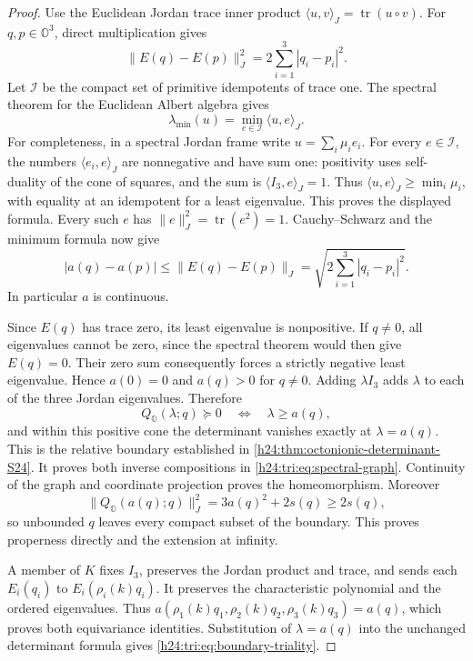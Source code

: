 \begin{proof}
Use the Euclidean Jordan trace inner product
\(\langle u,v\rangle_J=\operatorname{tr}(u\circ v)\).
For \(q,p\in\mathbb O^3\), direct multiplication gives
\[
 \|E(q)-E(p)\|_J^2=2\sum_{i=1}^3|q_i-p_i|^2.
\]
Let \(\mathcal I\) be the compact set of primitive idempotents of
trace one. The spectral theorem for the Euclidean Albert algebra gives
\[
 \lambda_{\min}(u)=\min_{e\in\mathcal I}\langle u,e\rangle_J.
\]
For completeness, in a spectral Jordan frame write
\(u=\sum_i\mu_i e_i\). For every \(e\in\mathcal I\), the numbers
\(\langle e_i,e\rangle_J\) are nonnegative and have sum one: positivity
uses self-duality of the cone of squares, and the sum is
\(\langle I_3,e\rangle_J=1\). Thus
\(\langle u,e\rangle_J\geq\min_i\mu_i\), with equality at an
idempotent for a least eigenvalue. This proves the displayed formula.
Every such \(e\) has \(\|e\|_J^2=\operatorname{tr}(e^2)=1\).
Cauchy--Schwarz and the minimum formula now give
\begin{equation}
 |a(q)-a(p)|\leq\|E(q)-E(p)\|_J
       =\sqrt{2\sum_{i=1}^3|q_i-p_i|^2}.
 \label{h24:tri:eq:spectral-Lipschitz}
\end{equation}
In particular \(a\) is continuous.

Since \(E(q)\) has trace zero, its least eigenvalue is nonpositive.
If \(q\ne0\), all eigenvalues cannot be zero, since the spectral theorem
would then give \(E(q)=0\). Their zero sum consequently forces a
strictly negative least eigenvalue. Hence \(a(0)=0\) and
\(a(q)>0\) for \(q\ne0\).
Adding \(\lambda I_3\) adds \(\lambda\) to each of the three Jordan
eigenvalues. Therefore
\[
 Q_{\mathbb O}(\lambda;q)\succeq0
       \quad\Longleftrightarrow\quad\lambda\geq a(q),
\]
and within this positive cone the determinant vanishes exactly at
\(\lambda=a(q)\). This is the relative boundary established in
\cref{h24:thm:octonionic-determinant-S24}. It proves both inverse
compositions in \eqref{h24:tri:eq:spectral-graph}.
Continuity of the graph and coordinate projection proves the
homeomorphism. Moreover
\[
 \|Q_{\mathbb O}(a(q);q)\|_J^2=3a(q)^2+2s(q)\geq2s(q),
\]
so unbounded \(q\) leaves every compact subset of the boundary.
This proves properness directly and the extension at infinity.

A member of \(K\) fixes \(I_3\), preserves the Jordan product and trace,
and sends each \(E_i(q_i)\) to \(E_i(\rho_i(k)q_i)\). It preserves
the characteristic polynomial and the ordered eigenvalues. Thus
\(a(\rho_1(k)q_1,\rho_2(k)q_2,\rho_3(k)q_3)=a(q)\), which proves
both equivariance identities. Substitution of \(\lambda=a(q)\) into
the unchanged determinant formula gives
\eqref{h24:tri:eq:boundary-triality}.
\end{proof}

